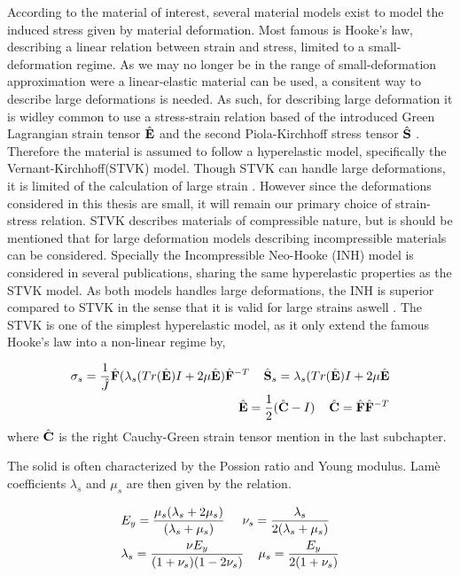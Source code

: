 According to the material of interest, several material models exist to model the induced stress given by material deformation. Most famous is Hooke's law, describing a linear relation between strain and stress, limited to a small-deformation regime. As we may no longer be in the range of small-deformation approximation were a linear-elastic material can be used, a consitent way to describe large deformations is needed. As such, for describing large deformation it is widley common to use a stress-strain relation based of the introduced Green Lagrangian strain tensor $\hat{\mathbf{E}}$ and the second Piola-Kirchhoff stress tensor $\hat{\mathbf{S}}$ \cite{Razzaq2010}. Therefore the material is assumed to follow a hyperelastic model, specifically the Vernant-Kirchhoff(STVK) model. Though STVK can handle large deformations, it is limited of the calculation of large strain \cite{Razzaq2010}. However since the deformations considered in this thesis are small, it will remain our primary choice of strain-stress relation.  STVK describes materials of compressible nature,  but is should be mentioned that for large deformation models describing incompressible materials can be considered. Specially the Incompressible Neo-Hooke (INH) model is considered in several publications, sharing the same hyperelastic properties as the STVK model. As both models handles large deformations, the INH is superior compared to STVK in the sense that it is valid for large strains aswell \cite{Razzaq2010}. \newpage
The STVK is one of the simplest hyperelastic model, as it only extend the famous Hooke's law into a non-linear regime by,

\begin{align*}
\sigma_s = \frac{1}{\hat{J}} \hat{\mathbf{F}}(\lambda_s(Tr(\hat{\mathbf{E}}) I + 2 \mu \hat{\mathbf{E}})\hat{\mathbf{F}}^{-T} \hspace{4mm}
\hat{\mathbf{S}}_s = \lambda_s(Tr(\hat{\mathbf{E}}) I + 2 \mu \hat{\mathbf{E}} \\
\hat{\mathbf{E}} = \frac{1}{2}(\hat{\mathbf{C}} - I ) \hspace{4mm} \hat{\mathbf{C}} = \hat{\mathbf{F}}\hat{\mathbf{F}}^{-T}
\end{align*} 
 where $\hat{\mathbf{C}}$ is the right Cauchy-Green strain tensor mention in the last subchapter. 
  
 The solid is often characterized by the Possion ratio and Young modulus. Lamè coefficients  $\lambda_s$ and $\mu_s$ are then given by the relation.

\begin{align*}
&E_y = \frac{ \mu_s ( \lambda_s + 2 \mu_s) }{ ( \lambda_s + \mu_s ) } 
\hspace{5mm} \nu_s = \frac{\lambda_s}{2(\lambda_s + \mu_s)} \\
&\lambda_s = \frac{\nu E_y}{(1 + \nu_s)(1 - 2\nu_s)} \hspace{4mm} \mu_s = \frac{E_y}{2(1 + \nu_s)} 
\end{align*}


